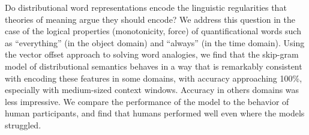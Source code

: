 Do distributional word representations encode the linguistic regularities that theories of meaning argue they should encode? We address this question in the case of the logical properties (monotonicity, force) of quantificational words such as ``everything'' (in the object domain) and ``always'' (in the time domain). Using the vector offset approach to solving word analogies, we find that the skip-gram model of distributional semantics behaves in a way that is remarkably consistent with encoding these features in some domains, with accuracy approaching 100\%, especially with medium-sized context windows. Accuracy in others domains was less impressive. We compare the performance of the model to the behavior of human participants, and find that humans performed well even where the models struggled.
